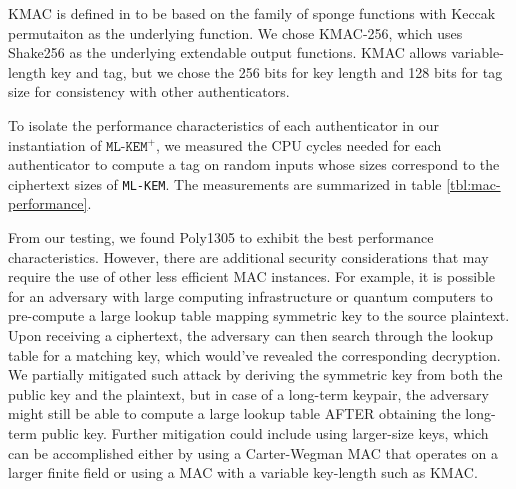 \documentclass[journal=tches,submission]{iacrtrans}
\begin{document}

KMAC is defined in \cite{SP80053r4} to be based on the family of sponge functions with Keccak permutaiton as the underlying function. We chose KMAC-256, which uses Shake256 as the underlying extendable output functions. KMAC allows variable-length key and tag, but we chose the 256 bits for key length and 128 bits for tag size for consistency with other authenticators.

To isolate the performance characteristics of each authenticator in our instantiation of $\texttt{ML-KEM}^+$, we measured the CPU cycles needed for each authenticator to compute a tag on random inputs whose sizes correspond to the ciphertext sizes of \texttt{ML-KEM}. The measurements are summarized in table \ref{tbl:mac-performance}.

From our testing, we found Poly1305 to exhibit the best performance characteristics. However, there are additional security considerations that may require the use of other less efficient MAC instances. For example, it is possible for an adversary with large computing infrastructure or quantum computers to pre-compute a large lookup table mapping symmetric key to the source plaintext. Upon receiving a ciphertext, the adversary can then search through the lookup table for a matching key, which would've revealed the corresponding decryption. We partially mitigated such attack by deriving the symmetric key from both the public key and the plaintext, but in case of a long-term keypair, the adversary might still be able to compute a large lookup table AFTER obtaining the long-term public key. Further mitigation could include using larger-size keys, which can be accomplished either by using a Carter-Wegman MAC that operates on a larger finite field or using a MAC with a variable key-length such as KMAC.
\end{document}
